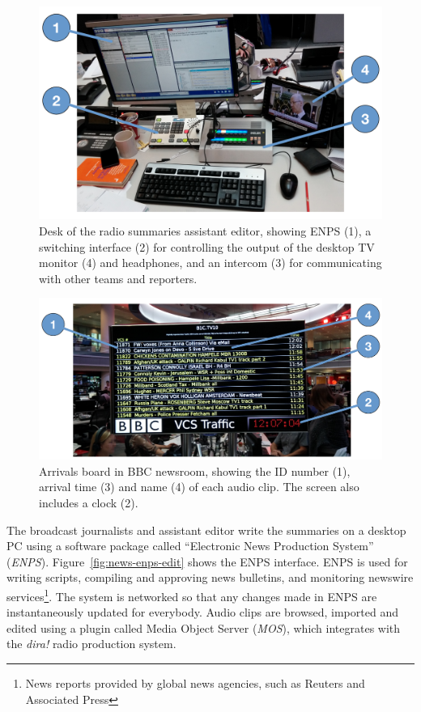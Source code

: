 \begin{figure}[p]
  \centering
  \includegraphics[width=\columnwidth]{figs/news-desk-labelled.pdf}
  \caption{Desk of the radio summaries assistant editor, showing ENPS (1), a switching interface (2) for controlling the output of the desktop TV monitor (4) and headphones, and an intercom (3) for communicating with other teams and reporters.}
  \label{fig:news-desktop}
\end{figure}

\begin{figure}[p]
  \centering
  \includegraphics[width=\columnwidth]{figs/arrivals-board-labelled.pdf}
  \caption{Arrivals board in BBC newsroom, showing the ID number (1), arrival time (3) and name (4) of each audio clip. The screen also includes a clock (2).}
  \label{fig:news-arrivals}
\end{figure}

The broadcast journalists and assistant editor write the summaries on a desktop PC using a software package called ``Electronic News Production System'' (\textit{ENPS}). Figure~\ref{fig:news-enps-edit} shows the ENPS interface. ENPS is used for writing scripts, compiling and approving news bulletins, and monitoring newswire services\footnote{News reports provided by global news agencies, such as Reuters and Associated Press}. The system is networked so that any changes made in ENPS are instantaneously updated for everybody. Audio clips are browsed, imported and edited using a plugin called Media Object Server (\textit{MOS}), which integrates with the \textit{dira!} radio production system.

